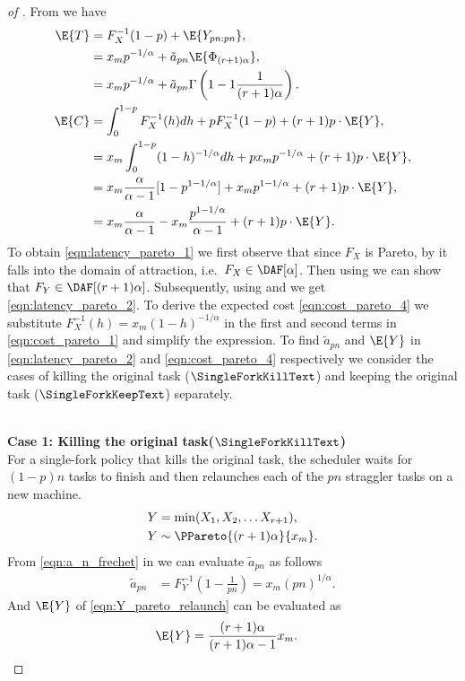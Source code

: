 \begin{proof}[of ]
From  we have
\begin{align}
\E{T} &= F_X^{-1}(1-p) + \E{ Y_{pn:pn}} \nonumber ,\\
&= x_m p^{-1/\alpha}  + \tilde{a}_{pn} \E{ \Phi_{(r+1)\alpha}} \label{eqn:latency_pareto_1} ,\\
&= x_m p^{-1/\alpha}  + \tilde{a}_{pn}  \Gamma \left( 1- 1\frac{1}{(r+1)\alpha} \right) \label{eqn:latency_pareto_2}. \\
\E{C} &=  \int_{0}^{1-p} F_X^{-1}(h) dh + p F_X^{-1}(1-p)  + (r+1) p \cdot \E{Y} ,\label{eqn:cost_pareto_1} \\
&= x_m \int_{0}^{1-p} (1-h)^{-1/\alpha} dh + p x_m p^{-1/\alpha}  + (r+1) p \cdot \E{Y} ,\nonumber \\
&= x_m \frac{\alpha}{\alpha-1} [1 - p^{1-1/\alpha} ] + x_m p^{1-1/\alpha}  + (r+1) p \cdot \E{Y} ,\nonumber \\
&= x_m \frac{\alpha}{\alpha-1} - x_m \frac{p^{1- 1/\alpha}}{\alpha-1} + (r+1) p \cdot \E{Y} .\label{eqn:cost_pareto_4}
\end{align}
To obtain \eqref{eqn:latency_pareto_1} we first observe that since $F_X$ is Pareto, by
 it falls into the \Frechet{} domain of attraction, i.e.\ $F_X \in
\DAF[\alpha]$. Then using  we can show that $F_Y \in \DAF[(r+1)\alpha]$. Subsequently, using
 and  we get \eqref{eqn:latency_pareto_2}. To derive the expected cost
\eqref{eqn:cost_pareto_4} we substitute $F^{-1}_X(h) = x_m (1-h)^{-1/\alpha}$ in the first and second terms in
\eqref{eqn:cost_pareto_1} and simplify the expression.
To find $\tilde{a}_{pn}$ and $\E{Y}$ in \eqref{eqn:latency_pareto_2} and \eqref{eqn:cost_pareto_4} respectively we
consider the cases of killing the original task ($\SingleForkKillText$) and keeping the original task
($\SingleForkKeepText$) separately. 

~\\
\textbf{Case 1: Killing the original task($\SingleForkKillText$)} \\
For a single-fork policy that kills the original task, the scheduler waits for $(1-p)n$ tasks to finish and then relaunches each of the $pn$ straggler tasks on a new machine. 
\begin{align}
Y &= \min( X_1, X_2, \dots X_{r+1} ) ,\nonumber \\
Y &\sim \PPareto{(r+1)\alpha}{x_m} . \label{eqn:Y_pareto_relaunch}
\end{align}
From \eqref{eqn:a_n_frechet} in  we can evaluate $\tilde{a}_{pn}$ as follows
\begin{align*}
\tilde{a}_{pn} &= F_Y^{-1}\left(1- \frac{1}{pn} \right) = x_m (pn)^{1/\alpha} .
\end{align*}
And $\E{Y}$ of \eqref{eqn:Y_pareto_relaunch} can be evaluated as
\begin{align}
\E{Y} &= \frac{ (r+1) \alpha }{ (r+1) \alpha - 1} x_m .
\end{align}


\end{proof}
